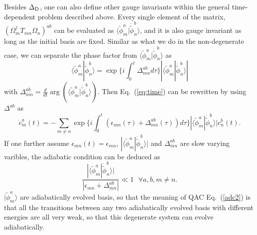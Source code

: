 \documentclass[aps,pra,twocolumn,groupedaddress,10pt]{revtex4}
\begin{document}
\begin{widetext}
Besides $\Delta_{\rm{D}}$, one can also define other gauge invariants within the general time-dependent problem described above.
Every single element of the matrix, $(\Omega_{m}^{\dag}T_{mn}\Omega_{n})^{ab}$ can be evaluated as $\langle\tilde{\phi}_m^a|\dot{\tilde{\phi}}_n^b\rangle$, and it is also gauge invariant as long as the initial basis are fixed.
Similar as what we do in the non-degenerate case, we can separate the phase factor from $\langle\tilde{\phi}_m^a|\dot{\tilde{\phi}}_n^b\rangle$ as
\begin{equation}
	\langle\tilde{\phi}_m^a|\dot{\tilde{\phi}}_n^b\rangle = \exp \{i\int_0^t \Delta^{ab}_{mn} d\tau \} |\langle\tilde{\phi}_m^a|\dot{\tilde{\phi}}_n^b\rangle|
\end{equation}
with $\Delta^{ab}_{mn} = \frac{d}{dt} \arg(\langle\tilde{\phi}_m^a|\dot{\tilde{\phi}}_n^b\rangle)$.
Then Eq.~(\ref{eq:time}) can be rewritten by using $\Delta^{ab}$ as
\begin{equation}
	\dot{c}_m^a(t) = -\sum_{m\neq n} \exp \{i\int_0^t (\epsilon_{mn}(\tau) + \Delta^{ab}_{mn}(\tau)) d\tau \}|\langle\tilde{\phi}_m^a|\dot{\tilde{\phi}}_n^b\rangle| c_n^b(t).
\end{equation}
If one further assume $\epsilon_{mn}(t) = \epsilon_{mn}$, $|\langle\tilde{\phi}_m^a|\dot{\tilde{\phi}}_n^b\rangle|$ and $\Delta^{ab}_{mn}$ are slow varying varibles, the adiabatic condition can be deduced as
\begin{equation}\label{adc2}
	\frac{|\langle\tilde{\phi}_m^a|\dot{\tilde{\phi}}_n^b\rangle|}{|\epsilon_{mn} + \Delta^{ab}_{mn}|} \ll 1 ~~~\forall a, b,m\neq n.
\end{equation}
$|\tilde{\phi}_m^a\rangle$ are adiabatically evolved basis, so that the meaning of QAC Eq.~(\ref{adc2}) is that all the transitions between any two adiabatically evolved basis with different energies are all very weak, so that this degenerate system can evolve adiabatically.




\end{widetext}
\end{document}

